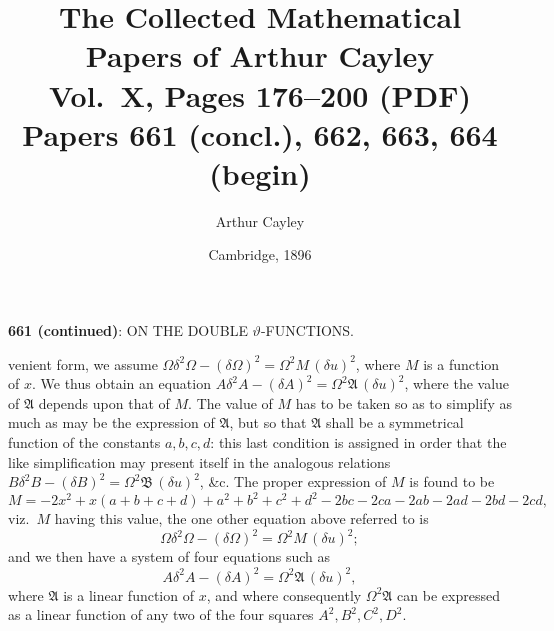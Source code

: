 \documentclass[11pt,a4paper]{article}
\title{The Collected Mathematical Papers of Arthur Cayley\\[6pt]
\large Vol.~X, Pages 176--200 (PDF) \\[4pt]
\normalsize Papers 661 (concl.), 662, 663, 664 (begin)}
\author{Arthur Cayley}
\date{Cambridge, 1896}
\begin{document}
\maketitle
\thispagestyle{fancy}

\setcounter{page}{176}



\begin{center}
\textbf{661 (continued)}: ON THE DOUBLE $\vartheta$-FUNCTIONS.
\end{center}

\medskip

\noindent venient form, we assume $\Omega\delta^{2}\Omega - (\delta\Omega)^{2} = \Omega^{2}M\,(\delta u)^{2}$, where $M$ is a function of $x$. We thus obtain an equation $A\delta^{2}A - (\delta A)^{2} = \Omega^{2}\mathfrak{A}\,(\delta u)^{2}$, where the value of $\mathfrak{A}$ depends upon that of $M$. The value of $M$ has to be taken so as to simplify as much as may be the expression of $\mathfrak{A}$, but so that $\mathfrak{A}$ shall be a symmetrical function of the constants $a, b, c, d$: this last condition is assigned in order that the like simplification may present itself in the analogous relations $B\delta^{2}B - (\delta B)^{2} = \Omega^{2}\mathfrak{B}\,(\delta u)^{2}$, \&c. The proper expression of $M$ is found to be
\[
M = -2x^{2} + x(a + b + c + d) + a^{2} + b^{2} + c^{2} + d^{2} - 2bc - 2ca - 2ab - 2ad - 2bd - 2cd,
\]
viz.\ $M$ having this value, the one other equation above referred to is
\[
\Omega\delta^{2}\Omega - (\delta\Omega)^{2} = \Omega^{2} M\,(\delta u)^{2};
\]
and we then have a system of four equations such as
\[
A\delta^{2}A - (\delta A)^{2} = \Omega^{2}\mathfrak{A}\,(\delta u)^{2},
\]
where $\mathfrak{A}$ is a linear function of $x$, and where consequently $\Omega^{2}\mathfrak{A}$ can be expressed as a linear function of any two of the four squares $A^{2}, B^{2}, C^{2}, D^{2}$.

\medskip
\end{document}
